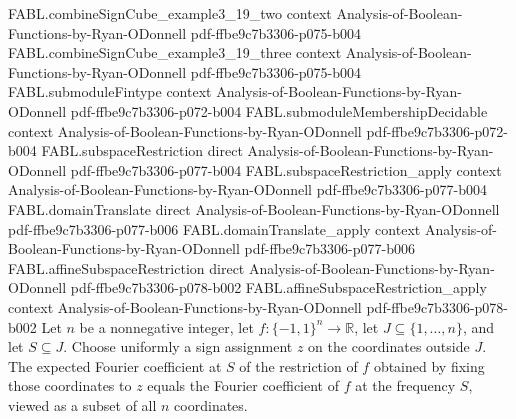 \begin{theorem}
  {FABL.combineSignCube_example3_19_two}
  {context}
  {Analysis-of-Boolean-Functions-by-Ryan-ODonnell}
  {pdf-ffbe9c7b3306-p075-b004}
\proofstep
  {FABL.combineSignCube_example3_19_three}
  {context}
  {Analysis-of-Boolean-Functions-by-Ryan-ODonnell}
  {pdf-ffbe9c7b3306-p075-b004}
\proofstep
  {FABL.submoduleFintype}
  {context}
  {Analysis-of-Boolean-Functions-by-Ryan-ODonnell}
  {pdf-ffbe9c7b3306-p072-b004}
\proofstep
  {FABL.submoduleMembershipDecidable}
  {context}
  {Analysis-of-Boolean-Functions-by-Ryan-ODonnell}
  {pdf-ffbe9c7b3306-p072-b004}
\proofstep
  {FABL.subspaceRestriction}
  {direct}
  {Analysis-of-Boolean-Functions-by-Ryan-ODonnell}
  {pdf-ffbe9c7b3306-p077-b004}
\proofstep
  {FABL.subspaceRestriction_apply}
  {context}
  {Analysis-of-Boolean-Functions-by-Ryan-ODonnell}
  {pdf-ffbe9c7b3306-p077-b004}
\proofstep
  {FABL.domainTranslate}
  {direct}
  {Analysis-of-Boolean-Functions-by-Ryan-ODonnell}
  {pdf-ffbe9c7b3306-p077-b006}
\proofstep
  {FABL.domainTranslate_apply}
  {context}
  {Analysis-of-Boolean-Functions-by-Ryan-ODonnell}
  {pdf-ffbe9c7b3306-p077-b006}
\proofstep
  {FABL.affineSubspaceRestriction}
  {direct}
  {Analysis-of-Boolean-Functions-by-Ryan-ODonnell}
  {pdf-ffbe9c7b3306-p078-b002}
\proofstep
  {FABL.affineSubspaceRestriction_apply}
  {context}
  {Analysis-of-Boolean-Functions-by-Ryan-ODonnell}
  {pdf-ffbe9c7b3306-p078-b002}
Let $n$ be a nonnegative integer, let $f:\{−1,1\}^{n}\to\mathbb{R}$, let
$J\subseteq\{1,\ldots,n\}$, and let $S\subseteq J$. Choose uniformly a sign assignment
$z$ on the coordinates outside $J$. The expected Fourier coefficient at $S$ of the
restriction of $f$ obtained by fixing those coordinates to $z$ equals the Fourier
coefficient of $f$ at the frequency $S$, viewed as a subset of all $n$ coordinates.
\end{theorem}

